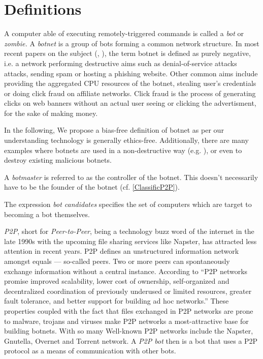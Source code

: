 \documentclass{llncs}
\begin{document}
\section{Definitions}
A computer able of executing remotely-triggered commands is called a
{\it bot} or {\it zombie.} A {\it botnet} is a group of bots forming a
common network structure.\cite{schoof2007detecting} In most recent
papers on the subject (\cite{wang2009systematic},
\cite{abu2006multifaceted}), the term botnet is defined as purely
negative, i.e. a network performing destructive aims such as
denial-of-service attacks attacks, sending spam or hosting a phishing
website\cite{steggink2007detection}. Other common aims include
providing the aggregated CPU resources of the botnet, stealing user's
credentials \cite{borgaonkar2010analysis} or doing click fraud on
affiliate networks\cite{clickFraud}. Click fraud is the process of
generating clicks on web banners without an actual user seeing or
clicking the advertisment, for the sake of making money. 

In the following, We propose a bias-free definition of botnet as per
our understanding technology is generally ethics-free. Additionally,
there are many examples where botnets are used in a non-destructive
way (e.g. \cite{seti}), or even to destroy existing malicious botnets.

A {\it botmaster} is referred to as the controller of the botnet. This
doesn't necessarily have to be the founder of the botnet (cf. \ref{ClassificP2P}).

The expression {\it bot candidates} specifies the set of computers
which are target to becoming a bot themselves.

{\it P2P}, short for {\it Peer-to-Peer}, being a technology buzz word
of the internet in the late 1990s with the upcoming file sharing
services like Napster\cite{napster}, has attracted less attention in
recent years. P2P defines an unstructured information network
amongst equals --- so-called peers. Two or more peers can
spontaneously exchange information without a central
instance. According to \cite{schoder2005core} ``P2P networks promise
improved scalability, lower cost of ownership, self-organized and
decentralized coordination of previously underused or limited
resources, greater fault tolerance, and better support for building ad
hoc networks.''  These properties coupled with the fact that files
exchanged in P2P networks are prone to malware, trojans and viruses
make P2P networks a most-attractive base for building botnets. With so many 
Well-known P2P networks include the Napster\cite{napster}, Gnutella,
Overnet and Torrent network.  A {\it P2P bot} then is a bot that uses
a P2P protocol as a means of communication with other bots.
\end{document}
